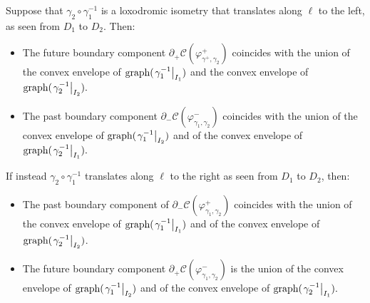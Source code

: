  \begin{proposition}\label{gettinthere}
    Suppose that $\gamma_2\circ\gamma_1^{-1}$ is a loxodromic isometry that translates along $\ell$ to the left, as seen from $D_1$ to $D_2$. Then:
     \begin{itemize}
         \item The future boundary component $\partial_+\mathcal{C}(\varphi_{\gamma^+,\gamma_2}^{+})$ coincides with the union of the convex envelope of $\text{graph}(\left.\gamma_1^{-1}\right|_{I_1})$ and the convex envelope of $\text{graph}(\left.\gamma_2^{-1}\right|_{I_2}).$
         \item The past boundary component $\partial_-\mathcal{C}(\varphi^-_{\gamma_1,\gamma_2})$ coincides with the union of the convex envelope of $\text{graph}(\left.\gamma_1^{-1}\right|_{I_2})$ and of the convex envelope of $\text{graph}(\left.\gamma_2^{-1}\right|_{I_1}).$
    \end{itemize}
    If instead $\gamma_2\circ\gamma_1^{-1}$ translates along $\ell$ to the right as seen from $D_1$ to $D_2$, then:
    \begin{itemize}
         \item The past boundary component of $\partial_-\mathcal{C}(\varphi_{\gamma_1,\gamma_2}^+)$ coincides with the union of the convex envelope of $\text{graph}(\left.\gamma_1^{-1}\right|_{I_1})$ and of the convex envelope of $\text{graph}(\left.\gamma_2^{-1}\right|_{I_2})$. 
         \item The future boundary component $\partial_+\mathcal{C}(\varphi_{\gamma_1,\gamma_2}^-)$ is the union of the convex envelope of $\text{graph}(\left.\gamma_1^{-1}\right|_{I_2})$ and of the convex envelope of $\text{graph}(\left.\gamma_2^{-1}\right|_{I_1}).$
     \end{itemize}
 \end{proposition}

